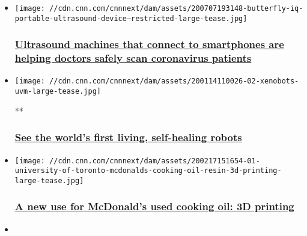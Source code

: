 \begin{itemize}
\item
  \href{/2020/07/08/tech/ultrasound-machine-handheld-coronavirus/index.html}{}

  \texttt{[image: //cdn.cnn.com/cnnnext/dam/assets/200707193148-butterfly-iq-portable-ultrasound-device---restricted-large-tease.jpg]}

  \hypertarget{ultrasound-machines-that-connect-to-smartphones-are-helping-doctors-safely-scan-coronavirus-patients}{%
  \subsubsection{\texorpdfstring{\href{/2020/07/08/tech/ultrasound-machine-handheld-coronavirus/index.html}{Ultrasound
  machines that connect to smartphones are helping doctors safely scan
  coronavirus
  patients}}{Ultrasound machines that connect to smartphones are helping doctors safely scan coronavirus patients}}\label{ultrasound-machines-that-connect-to-smartphones-are-helping-doctors-safely-scan-coronavirus-patients}}
\item
  \href{/videos/business/2020/01/14/living-robots-stem-cells-frogs-lon-orig-tp.cnn}{}

  \texttt{[image: //cdn.cnn.com/cnnnext/dam/assets/200114110026-02-xenobots-uvm-large-tease.jpg]}

  **

  \hypertarget{see-the-worlds-first-living-self-healing-robots}{%
  \subsubsection{\texorpdfstring{\href{/videos/business/2020/01/14/living-robots-stem-cells-frogs-lon-orig-tp.cnn}{See
  the world's first living, self-healing
  robots}}{See the world's first living, self-healing robots}}\label{see-the-worlds-first-living-self-healing-robots}}
\item
  \href{/2020/02/19/business/mcdonalds-oil-3d-printing/index.html}{}

  \texttt{[image: //cdn.cnn.com/cnnnext/dam/assets/200217151654-01-university-of-toronto-mcdonalds-cooking-oil-resin-3d-printing-large-tease.jpg]}

  \hypertarget{a-new-use-for-mcdonalds-used-cooking-oil-3d-printing}{%
  \subsubsection{\texorpdfstring{\href{/2020/02/19/business/mcdonalds-oil-3d-printing/index.html}{A
  new use for McDonald's used cooking oil: 3D
  printing}}{A new use for McDonald's used cooking oil: 3D printing}}\label{a-new-use-for-mcdonalds-used-cooking-oil-3d-printing}}
\item
  \href{/2019/08/02/business/bar-facial-recognition-scli-gbr-intl/index.html}{}


\end{itemize}
